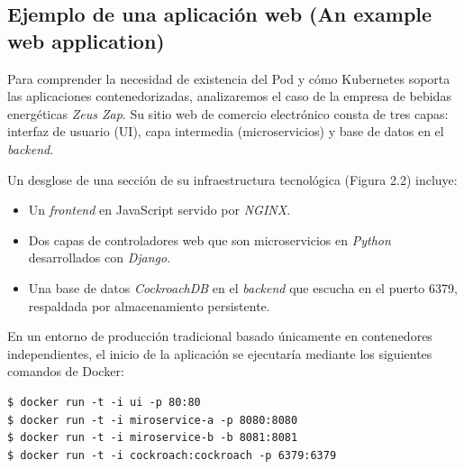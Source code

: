 \subsection{Ejemplo de una aplicación web (An example web application)}

Para comprender la necesidad de existencia del Pod y cómo Kubernetes soporta las aplicaciones contenedorizadas, analizaremos el caso de la empresa de bebidas energéticas \textit{Zeus Zap}. Su sitio web de comercio electrónico consta de tres capas: interfaz de usuario (UI), capa intermedia (microservicios) y base de datos en el \textit{backend}. 

Un desglose de una sección de su infraestructura tecnológica (Figura 2.2) incluye:
\begin{itemize}
    \item Un \textit{frontend} en JavaScript servido por \textit{NGINX}.
    \item Dos capas de controladores web que son microservicios en \textit{Python} desarrollados con \textit{Django}.
    \item Una base de datos \textit{CockroachDB} en el \textit{backend} que escucha en el puerto 6379, respaldada por almacenamiento persistente.
\end{itemize}

En un entorno de producción tradicional basado únicamente en contenedores independientes, el inicio de la aplicación se ejecutaría mediante los siguientes comandos de Docker:

\begin{verbatim}
$ docker run -t -i ui -p 80:80
$ docker run -t -i miroservice-a -p 8080:8080
$ docker run -t -i miroservice-b -b 8081:8081
$ docker run -t -i cockroach:cockroach -p 6379:6379
\end{verbatim}

